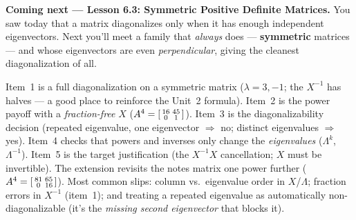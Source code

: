 \documentclass[10pt]{article}
\begin{document}
\begin{spiralbox}
\textbf{Coming next --- Lesson 6.3: Symmetric Positive Definite Matrices.} You saw today that a matrix
diagonalizes only when it has enough independent eigenvectors. Next you'll meet a family that
\emph{always} does --- \textbf{symmetric} matrices --- and whose eigenvectors are even \emph{perpendicular},
giving the cleanest diagonalization of all.
\end{spiralbox}

\begin{teachernote}
Item~1 is a full diagonalization on a symmetric matrix ($\lambda=3,-1$; the $X^{-1}$ has halves --- a good
place to reinforce the Unit~2 formula). Item~2 is the power payoff with a \emph{fraction-free} $X$
($A^4=\begin{bsmallmatrix}16&45\\0&1\end{bsmallmatrix}$). Item~3 is the diagonalizability decision (repeated
eigenvalue, one eigenvector $\Rightarrow$ no; distinct eigenvalues $\Rightarrow$ yes). Item~4 checks that
powers and inverses only change the \emph{eigenvalues} ($\Lambda^k$, $\Lambda^{-1}$). Item~5 is the target
justification (the $X^{-1}X$ cancellation; $X$ must be invertible). The extension revisits the notes matrix
one power further ($A^4=\begin{bsmallmatrix}81&65\\0&16\end{bsmallmatrix}$). Most common slips: column vs.\
eigenvalue order in $X$/$\Lambda$; fraction errors in $X^{-1}$ (item~1); and treating a repeated eigenvalue
as automatically non-diagonalizable (it's the \emph{missing second eigenvector} that blocks it).
\end{teachernote}
\end{document}
